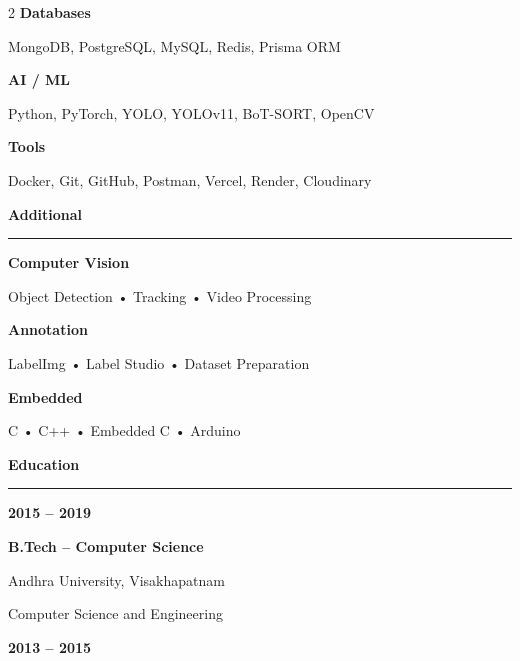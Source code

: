 ﻿\documentclass[10pt,a4paper]{article}
\newcommand{\cvsection}[1]{%
    \vspace{3pt}
    {\large\bfseries\textcolor{darkcol}{#1}}
    \par
    \vspace{2pt}
    {\color{accentcol}\rule{\linewidth}{1.1pt}}
    \vspace{3pt}
}
\newcommand{\skill}[2]{%
    {\small\bfseries\textcolor{darkcol}{#1}}
    \par
    {\small\RaggedRight\textcolor{darkcol}{#2}}
    \par
    \vspace{2pt}
}
\begin{document}
\begin{paracol}{2}
\skill
{Databases}
{MongoDB, PostgreSQL, MySQL, Redis, Prisma ORM}

\skill
{AI / ML}
{Python, PyTorch, YOLO, YOLOv11, BoT-SORT, OpenCV}

\skill
{Tools}
{Docker, Git, GitHub, Postman, Vercel, Render, Cloudinary}


\cvsection{Additional}

{\small\bfseries Computer Vision}

\vspace{1pt}

{\small
Object Detection • Tracking • Video Processing
}

\vspace{3pt}

{\small\bfseries Annotation}

\vspace{1pt}

{\small
LabelImg • Label Studio • Dataset Preparation
}

\vspace{3pt}

{\small\bfseries Embedded}

\vspace{1pt}

{\small
C • C++ • Embedded C • Arduino
}


\cvsection{Education}

{\small\bfseries 2015 -- 2019}

\vspace{1pt}

{\small\bfseries B.Tech -- Computer Science}

\vspace{1pt}

{\small
Andhra University, Visakhapatnam
}

\vspace{1pt}

{\small
Computer Science and Engineering
}

\vspace{4pt}

{\small\bfseries 2013 -- 2015}

\vspace{1pt}


\end{paracol}
\end{document}
